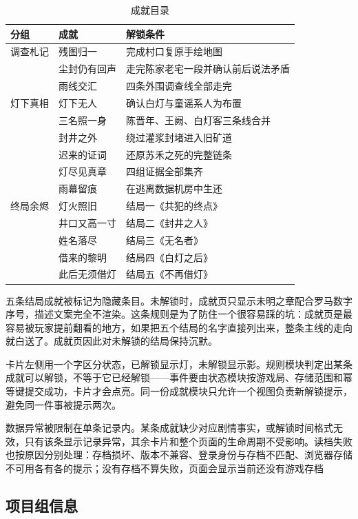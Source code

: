 \begin{table}[htbp]
\centering
\caption{成就目录}
\small
\begin{tabularx}{\linewidth}{@{}l l X@{}}
\toprule
分组 & 成就 & 解锁条件 \\
\midrule
调查札记 & 残图归一 & 完成村口复原手绘地图 \\
         & 尘封仍有回声 & 走完陈家老宅一段并确认前后说法矛盾 \\
         & 雨线交汇 & 四条外围调查线全部走完 \\
\addlinespace
灯下真相 & 灯下无人 & 确认白灯与童谣系人为布置 \\
         & 三名照一身 & 陈晋年、王阙、白灯客三条线合并 \\
         & 封井之外 & 绕过灌浆封堵进入旧矿道 \\
         & 迟来的证词 & 还原苏禾之死的完整链条 \\
         & 灯尽见真章 & 四组证据全部集齐 \\
         & 雨幕留痕 & 在逃离数据机房中生还 \\
\addlinespace
终局余烬 & 灯火照旧 & 结局一《共犯的终点》 \\
         & 井口又高一寸 & 结局二《封井之人》 \\
         & 姓名落尽 & 结局三《无名者》 \\
         & 借来的黎明 & 结局四《白灯之后》 \\
         & 此后无须借灯 & 结局五《不再借灯》 \\
\bottomrule
\end{tabularx}
\end{table}

五条结局成就被标记为隐藏条目。未解锁时，成就页只显示未明之章配合罗马数字序号，描述文案完全不渲染。这条规则是为了防住一个很容易踩的坑：成就页是最容易被玩家提前翻看的地方，如果把五个结局的名字直接列出来，整条主线的走向就白送了。成就页因此对未解锁的结局保持沉默。

卡片左侧用一个字区分状态，已解锁显示灯，未解锁显示影。规则模块判定出某条成就可以解锁，不等于它已经解锁——事件要由状态模块按游戏局、存储范围和幂等键提交成功，卡片才会点亮。同一份成就模块只允许一个视图负责新解锁提示，避免同一件事被提示两次。

数据异常被限制在单条记录内。某条成就缺少对应剧情事实，或解锁时间格式无效，只有该条显示记录异常，其余卡片和整个页面的生命周期不受影响。读档失败也按原因分别处理：存档损坏、版本不兼容、登录身份与存档不匹配、浏览器存储不可用各有各的提示；没有存档不算失败，页面会显示当前还没有游戏存档

\subsection{项目组信息}

